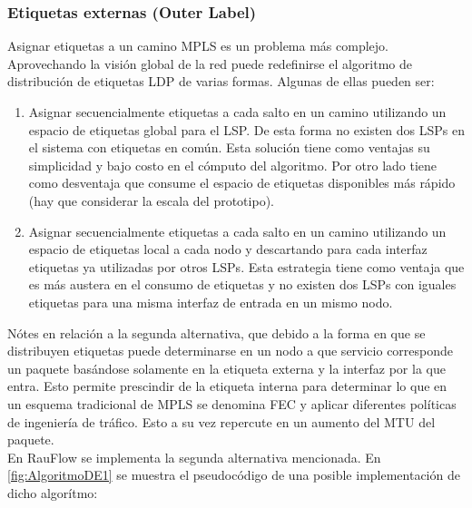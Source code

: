 \subsubsection{Etiquetas externas (Outer Label)}
Asignar etiquetas a un camino MPLS es un problema m\'as complejo. Aprovechando la visión global de la red puede redefinirse el algoritmo de distribución de etiquetas LDP de varias formas. Algunas de ellas pueden ser:

\begin{enumerate}
\item Asignar secuencialmente etiquetas a cada salto en un camino utilizando un espacio de etiquetas global para el LSP. De esta forma no existen dos LSPs en el sistema con etiquetas en com\'un. Esta solución tiene como ventajas su simplicidad y bajo costo en el c\'omputo del algoritmo. Por otro lado tiene como desventaja que consume el espacio de etiquetas disponibles m\'as r\'apido (hay que considerar la escala del prototipo).

\item Asignar secuencialmente etiquetas a cada salto en un camino utilizando un espacio de etiquetas local a cada nodo y descartando para cada interfaz etiquetas ya utilizadas por otros LSPs. Esta estrategia tiene como ventaja que es m\'as austera en el consumo de etiquetas y no existen dos LSPs con iguales etiquetas para una misma interfaz de entrada en un mismo nodo.
\end{enumerate}

N\'otes en relación a la segunda alternativa, que debido a la forma en que se distribuyen etiquetas puede determinarse en un nodo a que servicio corresponde un paquete bas\'andose solamente en la etiqueta externa y la interfaz por la que entra. Esto permite prescindir de la etiqueta interna para determinar lo que en un esquema tradicional de MPLS se denomina FEC y aplicar diferentes pol\'iticas de ingenier\'ia de tr\'afico. Esto a su vez repercute en un aumento del MTU del paquete.\\ 

En RauFlow se implementa la segunda alternativa mencionada. En \ref{fig:AlgoritmoDE1} se muestra el pseudoc\'odigo de una posible implementaci\'on de dicho algor\'itmo:\\

